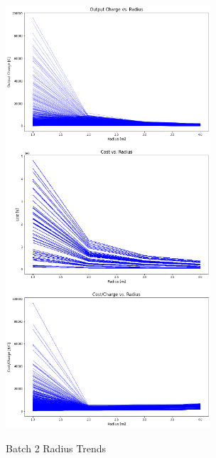 \begin{figure}
    \begin{center}
    \includegraphics[width=3in]{fig24.png}
    \end{center}
    \renewcommand{\baselinestretch}{1}
    \small\normalsize
    \begin{quote}
    \caption[Batch 2 Radius Trends]{Batch 2 Radius Trends} \label{fig: f24}
    \end{quote}
\end{figure}

